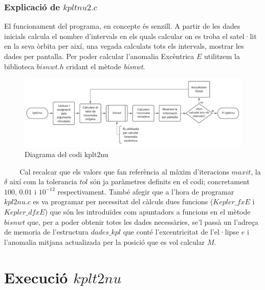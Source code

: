 \documentclass[12pt]{article}
\begin{document}
\subsubsection{Explicació de $kpltnu2.c$}
El funcionament del programa, en concepte és senzill. A partir de les dades inicials calcula el nombre d'intervals en els quals calcular on es troba el satel·lit en la seva òrbita per així, una vegada calculats tots els intervals, mostrar les dades per pantalla.
\newline
Per poder calcular l'anomalia Excèntrica $E$ utilitzem la biblioteca $bisnwt.h$ cridant el mètode \textit{bisnwt}.
\begin{figure}
\includegraphics[width=1\textwidth]{Diagrama-kplt2nu.PNG}
\caption{Diagrama del codi kplt2nu}
\label{fig:my_label}
\end{figure}
\textcolor{white}{hola}\newline\newline\newline\newline\newline\newline\newline\newline\newline\newline
Cal recalcar que els valors que fan referència al màxim d'iteracions $maxit$, la $\delta$ així com la tolerancia $tol$ són ja paràmetres definits en el codi; concretament $100$, $0.01$ i $10^{-12}$ respectivament.
\newline
També afegir que a l'hora de programar $kpl2nu.c$ es va programar per necessitat del càlculs dues funcions ($Kepler\_fxE$ i $Kepler\_dfxE$) que són les introduïdes com apuntadors a funcions en el mètode $bisnwt$ que, per a poder obtenir totes les dades necessàries, se'l passà un l'adreça de memoria de l'estructura $dades\_kpl$ que conté l'excentricitat de l'el·lipse $e$ i l'anomalia mitjana actualizada per la posició que es vol calcular $M$.
\newpage
\section{Execució $kplt2nu$}
\end{document}
